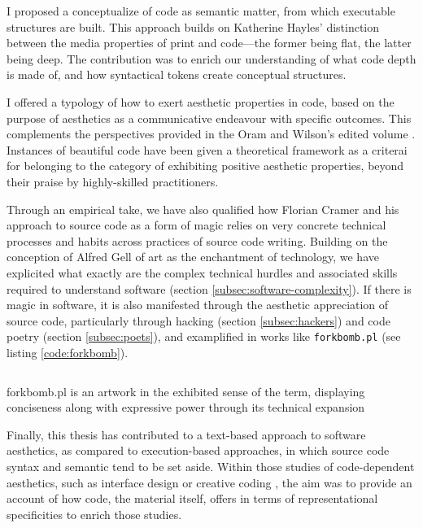 I proposed a conceptualize of code as semantic matter, from which executable structures are built. This approach builds on Katherine Hayles' distinction between the media properties of print and code—the former being flat, the latter being deep. The contribution was to enrich our understanding of what code depth is made of, and how syntactical tokens create conceptual structures.

I offered a typology of how to exert aesthetic properties in code, based on the purpose of aesthetics as a communicative endeavour with specific outcomes. This complements the perspectives provided in the Oram and Wilson's edited volume \citep{oram_beautiful_2007}. Instances of beautiful code have been given a theoretical framework as a criterai for belonging to the category of exhibiting positive aesthetic properties, beyond their praise by highly-skilled practitioners.

Through an empirical take, we have also qualified how Florian Cramer and his approach to source code as a form of magic relies on very concrete technical processes and habits across practices of source code writing. Building on the conception of Alfred Gell of art as the enchantment of technology, we have explicited what exactly are the complex technical hurdles and associated skills required to understand software (section \ref{subsec:software-complexity}). If there is magic in software, it is also manifested through the aesthetic appreciation of source code, particularly through hacking (section \ref{subsec:hackers}) and code poetry (section \ref{subsec:poets}), and examplified in works like \lstinline{forkbomb.pl} (see listing \ref{code:forkbomb}).

\begin{listing}
    \inputminted{perl}{./corpus/forkbomb.pl}
    \caption{forkbomb.pl is an artwork in the exhibited sense of the term, displaying conciseness along with expressive power through its technical expansion}
    \label{code:forkbomb}
\end{listing}

Finally, this thesis has contributed to a text-based approach to software aesthetics, as compared to execution-based approaches, in which source code syntax and semantic tend to be set aside. Within those studies of code-dependent aesthetics, such as interface design \citep{fishwick_aesthetic_2000} or creative coding \citep{cox_aesthetic_2020}, the aim was to provide an account of how code, the material itself, offers in terms of representational specificities to enrich those studies.

